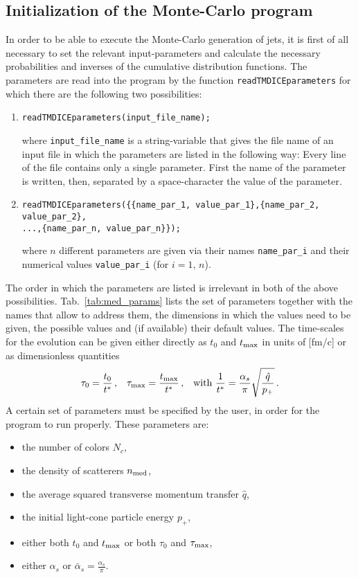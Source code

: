 \documentclass[preprint,12pt]{elsarticle}
\begin{document}
\subsection{Initialization of the Monte-Carlo program}
In order to be able to execute the Monte-Carlo generation of jets, it is first of all necessary to set the relevant input-parameters and calculate the necessary probabilities and inverses of the cumulative distribution functions.
The parameters are read into the program by the function \verb#readTMDICEparameters# 
for which there are the following two possibilities:
\begin{enumerate}
    \item 
    \begin{verbatim}
readTMDICEparameters(input_file_name);
    \end{verbatim}
    where \verb#input_file_name# is a string-variable that gives the file name of an input file in which the parameters are listed in the following way: 
    Every line of the file contains only a single parameter. First the name of the parameter is written, then, separated by a space-character the value of the parameter.
    \item \begin{verbatim}
readTMDICEparameters({{name_par_1, value_par_1},{name_par_2, value_par_2},
...,{name_par_n, value_par_n}});
    \end{verbatim}
   where $n$ different parameters are given via their names \verb#name_par_i# and their numerical values \verb#value_par_i# (for $i=1,\,n$).
\end{enumerate}
The order in which the parameters are listed is irrelevant in both of the above possibilities. 
Tab.~\ref{tab:med_params} lists the set of parameters together with the names that allow to address them, the dimensions in which the values need to be given, the possible values and (if available) their default values.
The time-scales for the evolution can be given either directly as $t_0$ and $t_{\rm max}$ in units of [fm/c] or as dimensionless quantities 
\begin{align}
    \tau_0=\frac{t_0}{t^\ast}\,,&&\tau_{\rm max}=\frac{t_{\rm max}}{t^\ast}\,,&&\textrm{with }\frac{1}{t^\ast}=\frac{\alpha_s}{\pi}\sqrt{\frac{\hat{q}}{p_+}}\,.
\end{align}
A certain set of parameters must be specified by the user, in order for the program to run properly.
These parameters are:
\begin{itemize}
    \item the number of colors $N_c$,
    \item the density of scatterers $n_{\rm med}$,
    \item the average squared transverse momentum transfer $\hat{q}$,
    \item the initial light-cone particle energy $p_+$,
    \item either both $t_0$ and $t_{\rm max}$ or both $\tau_0$ and $\tau_{\rm max}$,
    \item either $\alpha_s$ or $\bar{\alpha}_s=\frac{\alpha_s}{\pi}$.
\end{itemize}
\end{document}

